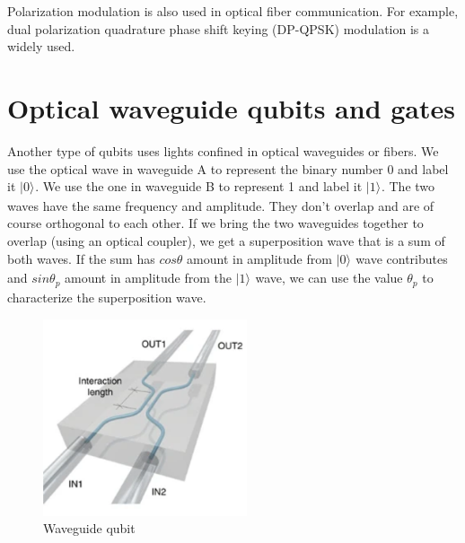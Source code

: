\documentclass{book}
\newcommand{\keta}[2][]{\vert {#2} \rangle_{#1}}
\begin{document}
Polarization modulation is also used in optical fiber communication. For example, dual polarization quadrature phase shift keying (DP-QPSK) modulation is a widely used.

\section{Optical waveguide qubits and gates}
Another type of qubits uses lights confined in optical waveguides or fibers. We use the optical wave in waveguide A to represent the binary number 0 and label it $\keta{0}$. We use the one in waveguide B to represent 1 and label it $\keta{1}$. The two waves have the same frequency and amplitude. They don't overlap and are of course orthogonal to each other. If we bring the two waveguides together to overlap (using an optical coupler), we get a superposition wave that is a sum of both waves. If the sum has $cos\theta$ amount in amplitude from $\keta{0}$ wave contributes and $sin\theta_p$ amount in amplitude from the $\keta{1}$ wave, we can use the value $\theta_p$ to characterize the superposition wave.

\begin{figure}[ht]
\includegraphics[width=6cm]{pic/wguideQubit.png}
\caption{Waveguide qubit}
\label{Waveguide}
\end{figure}
\end{document}
